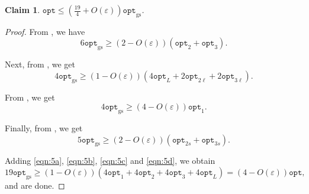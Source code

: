 \documentclass[10pt,a4paper]{amsart}
\renewcommand{\epsilon}{\varepsilon} %
\newtheorem{claim}[theorem]{Claim}
\theoremstyle{definition}
\newcommand{\alg}{\mathtt{opt}_{\mathrm{gs}}}
\newcommand{\opt}{\mathtt{opt}}
\newcommand{\opttwol}{\mathtt{opt}_{2\ell}}
\newcommand{\opttwos}{\mathtt{opt}_{2s}}
\newcommand{\optthreel}{\mathtt{opt}_{3\ell}}
\newcommand{\optthrees}{\mathtt{opt}_{3s}}
\begin{document}
\begin{enumerate}
    \begin{claim}
    \label{cla:19by4}
        $\displaystyle\opt \le \left(\frac{19}{4}+O(\epsilon)\right)\alg$.
    \end{claim}
    \begin{proof}
        From , we have
        \begin{equation}
        \label{eqn:5a}
            6\alg \ge (2-O(\epsilon))(\opt_2 + \opt_3).
        \end{equation}

        Next, from , we get
        \begin{equation}
        \label{eqn:5b}
            4\alg \ge (1-O(\epsilon))(4\opt_L + 2\opttwol + 2\optthreel). 
        \end{equation}

        From , we get
        \begin{equation}
        \label{eqn:5c}
            4\alg \ge (4-O(\epsilon))\opt_1.
        \end{equation}

        Finally, from , we get
        \begin{equation}
        \label{eqn:5d}
            5\alg \ge (2-O(\epsilon))(\opttwos + \optthrees).
        \end{equation}

        Adding \eqref{eqn:5a}, \eqref{eqn:5b}, \eqref{eqn:5c} and \eqref{eqn:5d}, we obtain
        \[ 19\alg \ge (1-O(\epsilon))(4\opt_1 + 4\opt_2 + 4\opt_3 + 4\opt_L) = (4-O(\epsilon))\opt,\]
        and are done.        
    \end{proof}



    
    
    


\end{enumerate}
\end{document}
